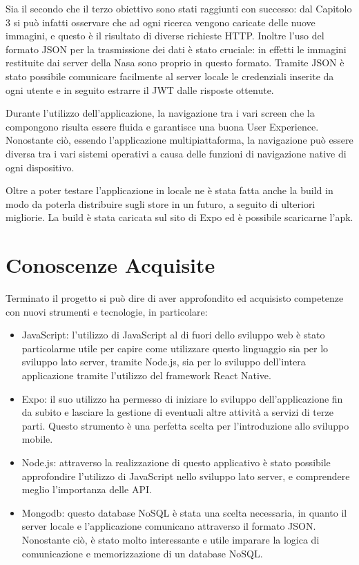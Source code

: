 Sia il secondo che il terzo obiettivo sono stati raggiunti con successo: dal Capitolo 3 si pu\`o infatti osservare che ad ogni ricerca vengono caricate delle nuove immagini, e questo \`e il risultato
di diverse richieste HTTP. Inoltre l'uso del formato JSON per la trasmissione dei dati \`e stato cruciale: in effetti le immagini restituite dai server della Nasa sono proprio in questo formato. Tramite JSON \`e stato possibile comunicare facilmente al server locale
le credenziali inserite da ogni utente e in seguito estrarre il JWT dalle risposte ottenute.

Durante l'utilizzo dell'applicazione, la navigazione tra i vari screen che la compongono risulta essere fluida e garantisce una buona User Experience. Nonostante ci\`o,
essendo l'applicazione multipiattaforma, la navigazione pu\`o essere diversa tra i vari sistemi operativi a causa delle funzioni di navigazione native di ogni dispositivo.

Oltre a poter testare l'applicazione in locale ne \`e stata fatta anche la build in modo da poterla distribuire sugli store in un futuro, a seguito di ulteriori migliorie.
La build \`e stata caricata sul sito di Expo ed \`e possibile scaricarne l'apk.

\section{Conoscenze Acquisite}
Terminato il progetto si pu\`o dire di aver approfondito ed acquisisto competenze con nuovi strumenti e tecnologie, in particolare:
\begin{itemize}
    \item JavaScript: l'utilizzo di JavaScript al di fuori dello sviluppo web \`e stato particolarme utile per capire come utilizzare questo linguaggio sia per lo sviluppo
          lato server, tramite Node.js, sia per lo sviluppo dell'intera applicazione tramite l'utilizzo del framework React Native.
    \item Expo: il suo utilizzo ha permesso di iniziare lo sviluppo dell'applicazione fin da subito e lasciare la gestione di eventuali altre attivit\`a a servizi di terze parti. Questo strumento \`e
          una perfetta scelta per l'introduzione allo sviluppo mobile.
    \item Node.js: attraverso la realizzazione di questo applicativo \`e stato possibile approfondire l'utilizzo di JavaScript nello sviluppo lato server, e comprendere meglio l'importanza delle API.
    \item Mongodb: questo database NoSQL \`e stata una scelta necessaria, in quanto il server locale e l'applicazione comunicano attraverso il formato JSON. Nonostante ci\`o, \`e stato molto interessante
          e utile imparare la logica di comunicazione e memorizzazione di un database NoSQL.
\end{itemize}

